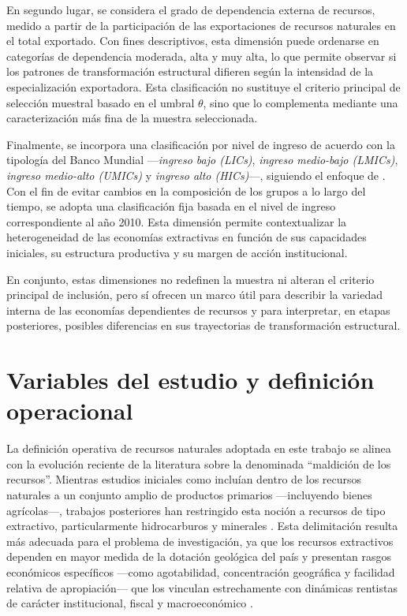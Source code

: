 \documentclass[../../PTFM.tex]{subfiles}
\begin{document}
	En segundo lugar, se considera el grado de dependencia externa de
	recursos, medido a partir de la participación de las exportaciones de
	recursos naturales en el total exportado. Con fines descriptivos, esta
	dimensión puede ordenarse en categorías de dependencia moderada, alta y
	muy alta, lo que permite observar si los patrones de transformación
	estructural difieren según la intensidad de la especialización
	exportadora. Esta clasificación no sustituye el criterio principal de
	selección muestral basado en el umbral $\theta$, sino que lo complementa
	mediante una caracterización más fina de la muestra seleccionada.

	Finalmente, se incorpora una clasificación por nivel de ingreso de acuerdo
	con la tipología del Banco Mundial ---\textit{ingreso bajo (LICs)},
	\textit{ingreso medio-bajo (LMICs)}, \textit{ingreso medio-alto (UMICs)}
	y \textit{ingreso alto (HICs)}---, siguiendo el enfoque de
	\textcite{Anne2021}. Con el fin de evitar cambios en la composición de los
	grupos a lo largo del tiempo, se adopta una clasificación fija basada en
	el nivel de ingreso correspondiente al año 2010. Esta dimensión permite
	contextualizar la heterogeneidad de las economías extractivas en función
	de sus capacidades iniciales, su estructura productiva y su margen de
	acción institucional.

	En conjunto, estas dimensiones no redefinen la muestra ni alteran el
	criterio principal de inclusión, pero sí ofrecen un marco útil para
	describir la variedad interna de las economías dependientes de recursos y
	para interpretar, en etapas posteriores, posibles diferencias en sus
	trayectorias de transformación estructural.
	\section{Variables del estudio y definición operacional}
	\label{sec:variables-estudio}

La definición operativa de recursos naturales adoptada en este trabajo se
alinea con la evolución reciente de la literatura sobre la denominada
``maldición de los recursos''. Mientras estudios iniciales como
\textcite{Sachs1995, Sachs1997} incluían dentro de los recursos naturales
a un conjunto amplio de productos primarios ---incluyendo bienes
agrícolas---, trabajos posteriores han restringido esta noción a
recursos de tipo extractivo, particularmente hidrocarburos y minerales
\parencite{Isham2005}. Esta delimitación resulta más adecuada para el
problema de investigación, ya que los recursos extractivos dependen en
mayor medida de la dotación geológica del país y presentan rasgos
económicos específicos ---como agotabilidad, concentración geográfica y
facilidad relativa de apropiación--- que los vinculan estrechamente con
dinámicas rentistas de carácter institucional, fiscal y macroeconómico
\parencite{Boschini2007, Lashitew2021}.
\end{document}
